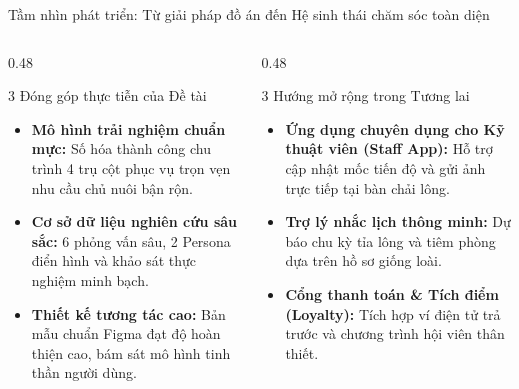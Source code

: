 \begin{frame}{Tầm nhìn phát triển: Từ giải pháp đồ án đến Hệ sinh thái chăm sóc toàn diện}
  \begin{columns}[T]
    \begin{column}{0.48\textwidth}
      \begin{block}{3 Đóng góp thực tiễn của Đề tài}
        \footnotesize
        \begin{itemize}
          \item \textbf{Mô hình trải nghiệm chuẩn mực:} Số hóa thành công chu trình 4 trụ cột phục vụ trọn vẹn nhu cầu chủ nuôi bận rộn.
          \item \textbf{Cơ sở dữ liệu nghiên cứu sâu sắc:} 6 phỏng vấn sâu, 2 Persona điển hình và khảo sát thực nghiệm minh bạch.
          \item \textbf{Thiết kế tương tác cao:} Bản mẫu chuẩn Figma đạt độ hoàn thiện cao, bám sát mô hình tinh thần người dùng.
        \end{itemize}
      \end{block}
    \end{column}

    \begin{column}{0.48\textwidth}
      \begin{exampleblock}{3 Hướng mở rộng trong Tương lai}
        \footnotesize
        \begin{itemize}
          \item \textbf{Ứng dụng chuyên dụng cho Kỹ thuật viên (Staff App):} Hỗ trợ cập nhật mốc tiến độ và gửi ảnh trực tiếp tại bàn chải lông.
          \item \textbf{Trợ lý nhắc lịch thông minh:} Dự báo chu kỳ tỉa lông và tiêm phòng dựa trên hồ sơ giống loài.
          \item \textbf{Cổng thanh toán \& Tích điểm (Loyalty):} Tích hợp ví điện tử trả trước và chương trình hội viên thân thiết.
        \end{itemize}
      \end{exampleblock}
    \end{column}
  \end{columns}
\end{frame}

